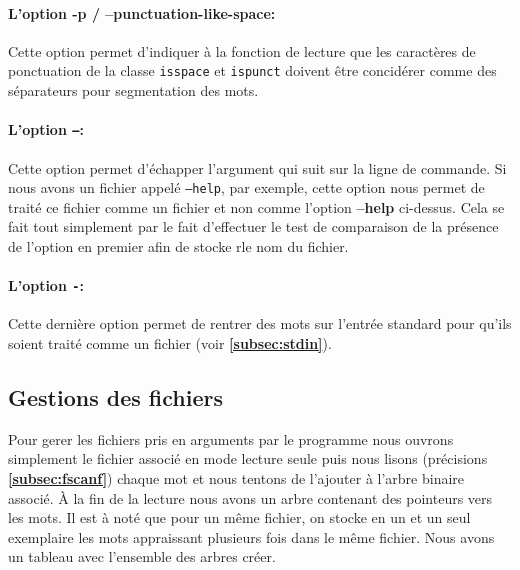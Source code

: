 \documentclass{article}
\begin{document}
\paragraph{L'option -p / --punctuation-like-space:}
Cette option permet d'indiquer à la fonction de lecture que les caractères de ponctuation de la classe \texttt{isspace} et \texttt{ispunct}
doivent être concidérer comme des séparateurs pour segmentation des mots.

\paragraph{L'option \texttt{--}:}
Cette option permet d'échapper l'argument qui suit sur la ligne de commande. Si nous avons un fichier appelé 
\texttt{--help}, par exemple, cette option nous permet de traité ce fichier comme un fichier et non comme l'option \textbf{--help} ci-dessus.
Cela se fait tout simplement par le fait d'effectuer le test de comparaison de la présence de l'option en premier afin de stocke rle nom du fichier.

\paragraph{L'option \texttt{-}:}
Cette dernière option permet de rentrer des mots sur l'entrée standard pour qu'ils soient traité comme un fichier (voir \textbf{\ref{subsec:stdin}}).

\subsection{Gestions des fichiers}\label{subsec:files}
Pour gerer les fichiers pris en arguments par le programme nous ouvrons simplement le fichier
associé en mode lecture seule puis nous lisons (précisions \textbf{\ref{subsec:fscanf}}) chaque
mot et nous tentons de l'ajouter à l'arbre binaire associé. À la fin de la lecture nous avons
un arbre contenant des pointeurs vers les mots. Il est à noté que pour un même fichier, on stocke
en un et un seul exemplaire les mots appraissant plusieurs fois dans le même fichier. Nous avons un
tableau avec l'ensemble des arbres créer.
\end{document}
